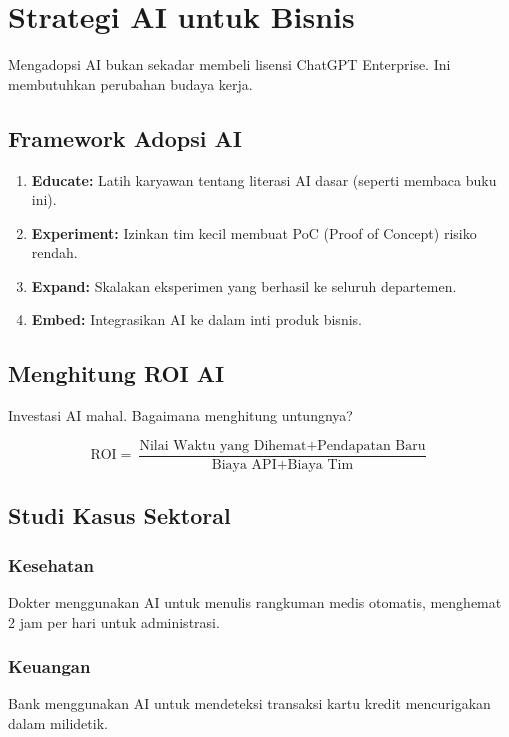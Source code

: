 \chapter{Strategi AI untuk Bisnis}
\label{chap:business}

Mengadopsi AI bukan sekadar membeli lisensi ChatGPT Enterprise. Ini membutuhkan perubahan budaya kerja.

\section{Framework Adopsi AI}

\begin{enumerate}
    \item \textbf{Educate:} Latih karyawan tentang literasi AI dasar (seperti membaca buku ini).
    \item \textbf{Experiment:} Izinkan tim kecil membuat PoC (Proof of Concept) risiko rendah.
    \item \textbf{Expand:} Skalakan eksperimen yang berhasil ke seluruh departemen.
    \item \textbf{Embed:} Integrasikan AI ke dalam inti produk bisnis.
\end{enumerate}

\section{Menghitung ROI AI}

Investasi AI mahal. Bagaimana menghitung untungnya?

$$ \text{ROI} = \frac{\text{Nilai Waktu yang Dihemat} + \text{Pendapatan Baru}}{\text{Biaya API} + \text{Biaya Tim}} $$

\section{Studi Kasus Sektoral}

\subsection{Kesehatan}
Dokter menggunakan AI untuk menulis rangkuman medis otomatis, menghemat 2 jam per hari untuk administrasi.

\subsection{Keuangan}
Bank menggunakan AI untuk mendeteksi transaksi kartu kredit mencurigakan dalam milidetik.

